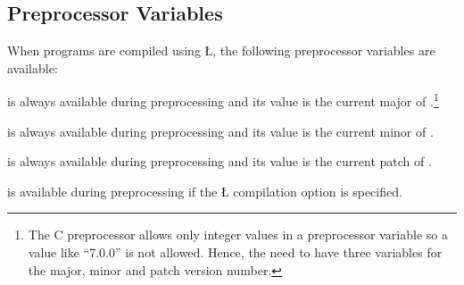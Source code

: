 \documentclass[openright,twoside]{report}
\newcommand{\Version}{7.0.0}
\begin{document}
\subsection{Preprocessor Variables}
\label{s:PreprocessorVariables}

When programs are compiled using \LGinlinetrue\LGbegin\lgrinde\L{}\endlgrinde\LGend{}, the following preprocessor variables are available:
\begin{prefix}
\item[\LGinlinetrue\LGbegin\lgrinde\L{\LB{\V{\_\_U\_CPLUSPLUS\_\_}}}\endlgrinde\LGend{}]
is always available during preprocessing and its value is the current major  of \uC.\footnote{
The C preprocessor allows only integer values in a preprocessor variable so a value like ``\Version'' is not allowed.
Hence, the need to have three variables for the major, minor and patch version number.}

\item[\LGinlinetrue\LGbegin\lgrinde\L{\LB{\V{\_\_U\_CPLUSPLUS\_MINOR\_\_}}}\endlgrinde\LGend{}]
is always available during preprocessing and its value is the current minor  of \uC.

\item[\LGinlinetrue\LGbegin\lgrinde\L{\LB{\V{\_\_U\_CPLUSPLUS\_PATCH\_\_}}}\endlgrinde\LGend{}]
is always available during preprocessing and its value is the current patch  of \uC.

\item[\LGinlinetrue\LGbegin\lgrinde\L{\LB{\V{\_\_U\_DEBUG\_\_}}}\endlgrinde\LGend{}]
is available during preprocessing if the \LGinlinetrue\LGbegin\lgrinde\L{}\endlgrinde\LGend{} compilation option is specified.


\end{prefix}
\end{document}
